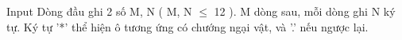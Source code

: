 Input
Dòng đầu ghi 2 số M, N ( M, N  $\le$  12 ). M dòng sau, mỗi dòng ghi N ký tự. Ký tự '*' thể hiện ô tương ứng có chướng ngại vật, và '.' nếu ngược lại.